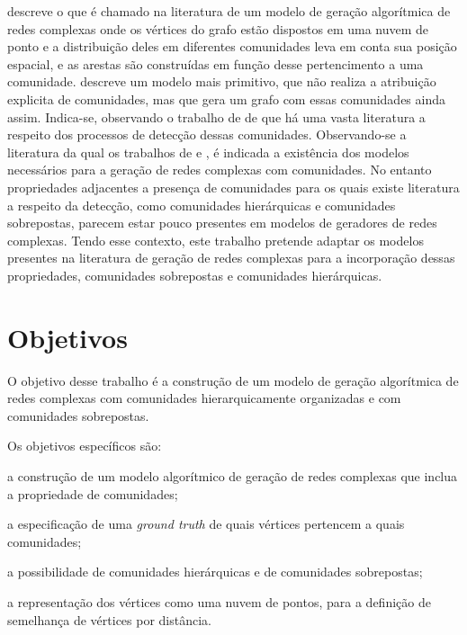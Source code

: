 \documentclass[notes.tex]{subfiles}
\begin{document}
 descreve o que é chamado na literatura de um modelo de geração algorítmica de redes complexas onde os vértices do grafo estão dispostos em uma nuvem de ponto e a distribuição deles em diferentes comunidades leva em conta sua posição espacial, e as arestas são construídas em função desse pertencimento a uma comunidade.
 descreve um modelo mais primitivo, que não realiza a atribuição explicita de comunidades, mas que gera um grafo com essas comunidades ainda assim. 
Indica-se, observando o trabalho de  de que há uma vasta literatura a respeito dos processos de detecção dessas comunidades.
Observando-se a literatura da qual os trabalhos de  e , é indicada a existência dos modelos necessários para a geração de redes complexas com comunidades.
No entanto propriedades adjacentes a presença de comunidades para os quais existe literatura a respeito da detecção, como comunidades hierárquicas e comunidades sobrepostas, parecem estar pouco presentes em modelos de geradores de redes complexas.
Tendo esse contexto, este trabalho pretende adaptar os modelos presentes na literatura de geração de redes complexas para a incorporação dessas propriedades, comunidades sobrepostas e comunidades hierárquicas.

\section{Objetivos}

O objetivo desse trabalho é a construção de um modelo de geração algorítmica de redes complexas com comunidades hierarquicamente organizadas e com comunidades sobrepostas.

Os objetivos específicos são:

\begin{alineas}
    \item a construção de um modelo algorítmico de geração de redes complexas que inclua a propriedade de comunidades;
    \item a especificação de uma \emph{ground truth} de quais vértices pertencem a quais comunidades;
    \item a possibilidade de comunidades hierárquicas e de comunidades sobrepostas;
    \item a representação dos vértices como uma nuvem de pontos, para a definição de semelhança de vértices por distância.
\end{alineas}
\end{document}
